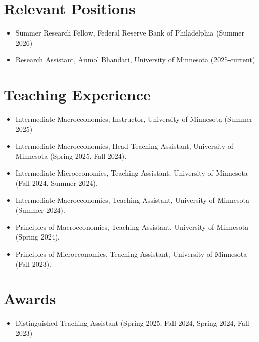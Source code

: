\documentclass{cv_style}
\begin{document}
	
		
	\section{Relevant Positions}
	\begin{itemize}
			\item Summer Research Fellow, Federal Reserve Bank of Philadelphia (Summer 2026)
			\item Research Assistant, Anmol Bhandari, University of Minnesota (2025-current)
		\end{itemize}

	\section{Teaching Experience}
	\begin{itemize}
            \item Intermediate Macroeconomics, Instructor, University of Minnesota (Summer 2025)
			\item Intermediate Macroeconomics, Head Teaching Assistant, University of Minnesota (Spring 2025, Fall 2024).
			\item Intermediate Microeconomics, Teaching Assistant, University of Minnesota (Fall 2024, Summer 2024).
			\item Intermediate Macroeconomics, Teaching Assistant, University of Minnesota (Summer 2024).
   			\item Principles of Macroeconomics, Teaching Assistant, University of Minnesota (Spring 2024).
      			\item Principles of Microeconomics, Teaching Assistant, University of Minnesota (Fall 2023).
		\end{itemize}

	\section{Awards}
		\begin{itemize}
			\item Distinguished Teaching Assistant (Spring 2025, Fall 2024, Spring 2024, Fall 2023)
		\end{itemize}
\end{document}
